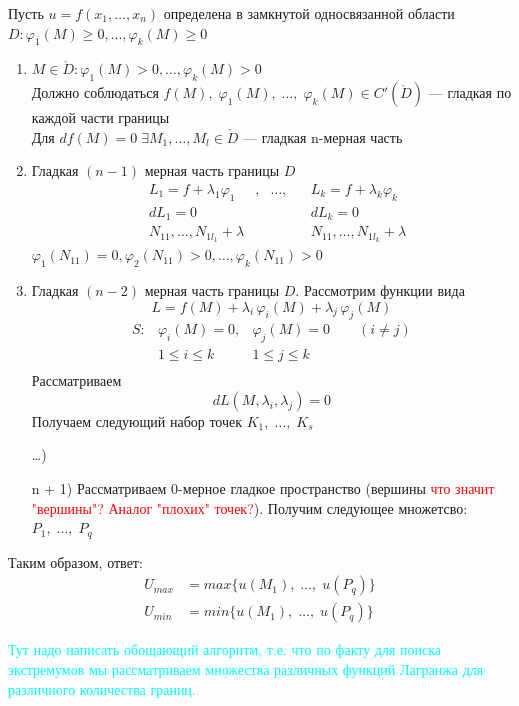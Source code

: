 \begin{Note}
    Пусть $u = f(x_1, \dots, x_n)$ определена в замкнутой односвязанной области $D : \varphi_1(M) \geqslant 0, \dots, \varphi_k(M) \geqslant 0$
    \begin{enumerate}
        \item $M \in \mathring{D}: \varphi_1(M) > 0, \dots, \varphi_k(M) > 0$\\
        Должно соблюдаться $f(M),\; \varphi_1(M),\; \dots,\; \varphi_k(M) \in C'(\mathring{D})$ --- гладкая по каждой части границы\\
        Для $df(M) = 0 \; \exists M_1, \dots, M_l \in \mathring{D}$ --- гладкая n-мерная часть
        
        \item Гладкая $(n-1)$ мерная часть границы $D$
        \begin{align*}
            &L_1 = f + \lambda_1\varphi_1&, &\dots,& &L_k = f + \lambda_k\varphi_k\\
            &dL_1 = 0& && & dL_k = 0\\
            &N_{1 1}, \dots, N_{1 l_1} + \lambda& && &N_{1 1}, \dots, N_{1 l_k} + \lambda
        \end{align*}
        $\varphi_1(N_{1 1}) = 0, \varphi_2(N_{1 1}) > 0, \dots, \varphi_k(N_{1 1}) > 0$
            
        \item Гладкая $(n-2)$ мерная часть границы $D$. Рассмотрим функции вида
        \[
            L = f(M) + \lambda_i\,\varphi_i(M) + \lambda_j\,\varphi_j(M)
        \]
        \begin{align*}
            S: &\varphi_i(M) = 0, &\varphi_j(M) = 0 \qquad (i \neq j)\\ 
            &1 \leqslant i \leqslant k  &1 \leqslant j \leqslant k\\
        \end{align*}
        Рассматриваем
        \[
            dL(M, \lambda_i, \lambda_j) = 0
        \]
        Получаем следующий набор точек $K_1,\; \dots,\; K_s$
        
        \item [\dots)]
        
        \item [n + 1)] Рассматриваем 0-мерное гладкое пространство 
        (вершины \textcolor{red}{что значит "вершины"? Аналог "плохих"  точек?}). Получим следующее множетсво: $P_1,\; \dots,\; P_q$
    \end{enumerate}
    Таким образом, ответ:
    \begin{align*}
        U_{max} &= max\{u(M_1), \; \dots, \; u(P_q)\}\\
        U_{min} &= min\{u(M_1), \; \dots, \; u(P_q)\}
    \end{align*}
\end{Note}
\textcolor{cyan}{Тут надо написать обощающий алгоритм, т.е. что по факту для поиска экстремумов мы рассматриваем множества различных функций Лагранжа для различного количества границ.}